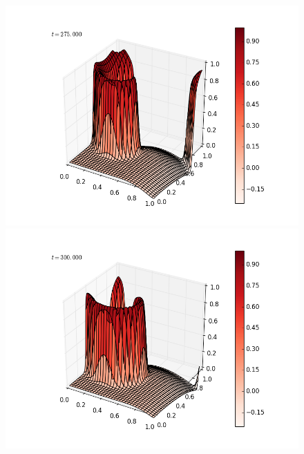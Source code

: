 \documentclass[12pt]{article}
\begin{document}
\begin{figure}[H]
\includegraphics[scale=0.4]{partc_fast_frames/partc_fast_fig13.png}
\includegraphics[scale=0.4]{partc_fast_frames/partc_fast_fig15.png}
\end{figure}
\end{document}
